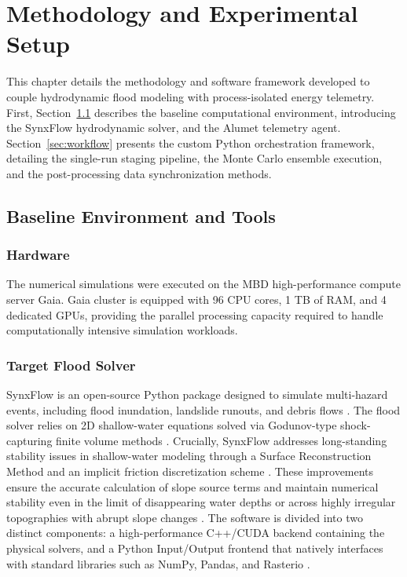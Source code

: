 \chapter{Methodology and Experimental Setup}
\label{ch:ownwork}

This chapter details the methodology and software framework developed to couple hydrodynamic flood modeling with process-isolated energy telemetry. First, Section~\ref{sec:baseline-environment} describes the baseline computational environment, introducing the SynxFlow hydrodynamic solver, and the Alumet telemetry agent. Section~\ref{sec:workflow} presents the custom Python orchestration framework, detailing the single-run staging pipeline, the Monte Carlo ensemble execution, and the post-processing data synchronization methods.


\section{Baseline Environment and Tools}
\label{sec:baseline-environment}

\subsection{Hardware}
\label{sec:hardware}

The numerical simulations were executed on the MBD high-performance compute server Gaia. Gaia cluster is equipped with 96 CPU cores, 1 TB of RAM, and 4 dedicated GPUs, providing the parallel processing capacity required to handle computationally intensive simulation workloads.

\subsection{Target Flood Solver}
\label{sec:flood-solver}

SynxFlow is an open-source Python package designed to simulate multi-hazard events, including flood inundation, landslide runouts, and debris flows \cite{Xia2025}. The flood solver relies on 2D shallow-water equations solved via Godunov-type shock-capturing finite volume methods \cite{Xia2017, Xia2025}. Crucially, SynxFlow addresses long-standing stability issues in shallow-water modeling through a Surface Reconstruction Method and an implicit friction discretization scheme \cite{Xia2017}. These improvements ensure the accurate calculation of slope source terms and maintain numerical stability even in the limit of disappearing water depths or across highly irregular topographies with abrupt slope changes \cite{Xia2017}. The software is divided into two distinct components: a high-performance C++/CUDA backend containing the physical solvers, and a Python Input/Output frontend that natively interfaces with standard libraries such as NumPy, Pandas, and Rasterio \cite{Xia2025, SynxFlowDocs2026}.

